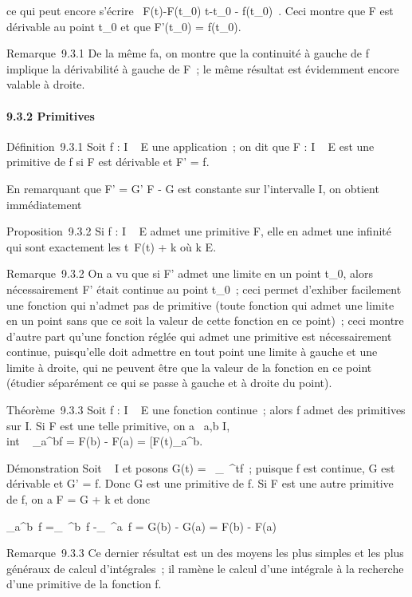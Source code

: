 \documentclass[]{article}
\begin{document}
ce qui peut encore s'écrire \
F(t)-F(t_0) \over t-t_0 -
f(t_0)\ \leq \epsilon. Ceci montre que F est
dérivable au point t_0 et que F'(t_0) =
f(t_0).

Remarque~9.3.1 De la même fa\ccon, on montre que la
continuité à gauche de f implique la dérivabilité à gauche de F~; le
même résultat est évidemment encore valable à droite.

\paragraph{9.3.2 Primitives}

Définition~9.3.1 Soit f : I \rightarrow~ E une application~; on dit que F : I \rightarrow~ E
est une primitive de f si F est dérivable et F' = f.

En remarquant que F' = G' \Leftrightarrow F - G est
constante sur l'intervalle I, on obtient immédiatement

Proposition~9.3.2 Si f : I \rightarrow~ E admet une primitive F, elle en admet une
infinité qui sont exactement les t\mapsto~F(t) + k
où k \in E.

Remarque~9.3.2 On a vu que si F' admet une limite en un point
t_0, alors nécessairement F' était continue au point
t_0~; ceci permet d'exhiber facilement une fonction qui n'admet
pas de primitive (toute fonction qui admet une limite en un point sans
que ce soit la valeur de cette fonction en ce point)~; ceci montre
d'autre part qu'une fonction réglée qui admet une primitive est
nécessairement continue, puisqu'elle doit admettre en tout point une
limite à gauche et une limite à droite, qui ne peuvent être que la
valeur de la fonction en ce point (étudier séparément ce qui se passe à
gauche et à droite du point).

Théorème~9.3.3 Soit f : I \rightarrow~ E une fonction continue~; alors f admet des
primitives sur I. Si F est une telle primitive, on a
\forall~a,b \in I, \\int ~
_a^bf = F(b) - F(a) = \left
{[}F(t)\right {]}_a^b.

Démonstration Soit \alpha~ \in I et posons G(t) =\int ~
_\alpha~^tf~; puisque f est continue, G est dérivable et G' = f.
Donc G est une primitive de f. Si F est une autre primitive de f, on a F
= G + k et donc

\int  _a^b~f
=\int  _\alpha~^b~f
-\int  _\alpha~^a~f = G(b) - G(a) = F(b)
- F(a)

Remarque~9.3.3 Ce dernier résultat est un des moyens les plus simples et
les plus généraux de calcul d'intégrales~; il ramène le calcul d'une
intégrale à la recherche d'une primitive de la fonction f.
\end{document}
